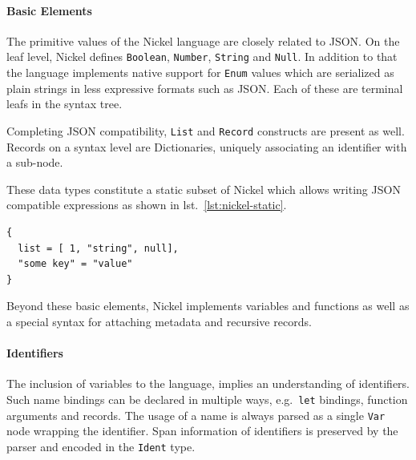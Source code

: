 \documentclass[
  a4paper,
  bibtex,
  english,
  nomenclature]{kthlatex/kththesis/kththesis}
\begin{document}
\hypertarget{sec:basic-elements}{%
\paragraph{Basic Elements}\label{sec:basic-elements}}

The primitive values of the Nickel language are closely related to JSON.
On the leaf level, Nickel defines \texttt{Boolean}, \texttt{Number},
\texttt{String} and \texttt{Null}. In addition to that the language
implements native support for \texttt{Enum} values which are serialized
as plain strings in less expressive formats such as JSON. Each of these
are terminal leafs in the syntax tree.

Completing JSON compatibility, \texttt{List} and \texttt{Record}
constructs are present as well. Records on a syntax level are
Dictionaries, uniquely associating an identifier with a sub-node.

These data types constitute a static subset of Nickel which allows
writing JSON compatible expressions as shown in
lst.~\ref{lst:nickel-static}.

\begin{codelisting}

\caption{Example of a static Nickel expression}

\hypertarget{lst:nickel-static}{%
\label{lst:nickel-static}}%
\begin{verbatim}
{
  list = [ 1, "string", null],
  "some key" = "value"
} 
\end{verbatim}

\end{codelisting}

Beyond these basic elements, Nickel implements variables and functions
as well as a special syntax for attaching metadata and recursive
records.

\hypertarget{sec:identifiers}{%
\paragraph{Identifiers}\label{sec:identifiers}}

The inclusion of variables to the language, implies an understanding of
identifiers. Such name bindings can be declared in multiple ways,
e.g.~\texttt{let} bindings, function arguments and records. The usage of
a name is always parsed as a single \texttt{Var} node wrapping the
identifier. Span information of identifiers is preserved by the parser
and encoded in the \texttt{Ident} type.
\end{document}
